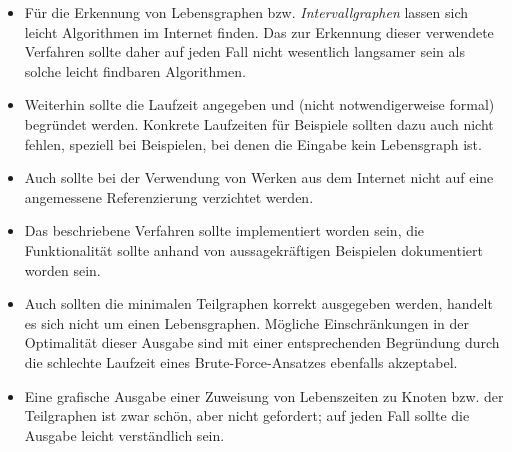 \begin{itemize}
\item Für die Erkennung von Lebensgraphen bzw. \emph{Intervallgraphen} lassen sich leicht Algorithmen im Internet finden. Das zur Erkennung dieser verwendete Verfahren sollte daher auf jeden Fall nicht wesentlich langsamer sein als solche leicht findbaren Algorithmen.
\item Weiterhin sollte die Laufzeit angegeben und (nicht notwendigerweise formal) begründet werden. Konkrete Laufzeiten für Beispiele sollten dazu auch nicht fehlen, speziell bei Beispielen, bei denen die Eingabe kein Lebensgraph ist.
\item Auch sollte bei der Verwendung von Werken aus dem Internet nicht auf eine angemessene Referenzierung verzichtet werden.
\item Das beschriebene Verfahren sollte implementiert worden sein, die Funktionalität sollte anhand von aussagekräftigen Beispielen dokumentiert worden sein.
\item Auch sollten die minimalen Teilgraphen korrekt ausgegeben werden, handelt es sich nicht um einen Lebensgraphen. Mögliche Einschränkungen in der Optimalität dieser Ausgabe sind mit einer entsprechenden Begründung durch die schlechte Laufzeit eines Brute-Force-Ansatzes ebenfalls akzeptabel.
\item Eine grafische Ausgabe einer Zuweisung von Lebenszeiten zu Knoten bzw. der Teilgraphen ist zwar schön, aber nicht gefordert; auf jeden Fall sollte die Ausgabe leicht verständlich sein.
\end{itemize}
